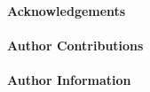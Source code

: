 \documentclass[12pt]{article}
\newcounter{lastnote}
\begin{document}
\paragraph*{Acknowledgements}


\paragraph*{Author Contributions}


\paragraph*{Author Information}















\clearpage
\end{document}
